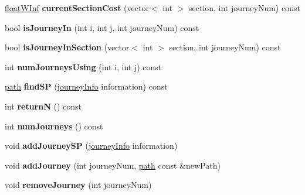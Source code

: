 \begin{DoxyCompactItemize}
\item 
\hypertarget{classedgeGroup_a2d23d9fec1e14e5e9d25389ac8576bb9}{
\hyperlink{classfloatWInf}{floatWInf} {\bfseries currentSectionCost} (vector$<$ int $>$ section, int journeyNum) const }
\label{classedgeGroup_a2d23d9fec1e14e5e9d25389ac8576bb9}

\item 
\hypertarget{classedgeGroup_a6c54fac4ebe0274e0ac9c040b8f2c15e}{
bool {\bfseries isJourneyIn} (int i, int j, int journeyNum) const }
\label{classedgeGroup_a6c54fac4ebe0274e0ac9c040b8f2c15e}

\item 
\hypertarget{classedgeGroup_aa1bbf4270ad97c1582011ea939460d09}{
bool {\bfseries isJourneyInSection} (vector$<$ int $>$ section, int journeyNum) const }
\label{classedgeGroup_aa1bbf4270ad97c1582011ea939460d09}

\item 
\hypertarget{classedgeGroup_a682cf284e27ec5ecc11904edc05feb71}{
int {\bfseries numJourneysUsing} (int i, int j) const }
\label{classedgeGroup_a682cf284e27ec5ecc11904edc05feb71}

\item 
\hypertarget{classedgeGroup_a9107f5c75bb210963582c0df769e9a34}{
\hyperlink{classpath}{path} {\bfseries findSP} (\hyperlink{classjourneyInfo}{journeyInfo} information) const }
\label{classedgeGroup_a9107f5c75bb210963582c0df769e9a34}

\item 
\hypertarget{classedgeGroup_a27d11c4fd553c080144a5a784e6cc079}{
int {\bfseries returnN} () const }
\label{classedgeGroup_a27d11c4fd553c080144a5a784e6cc079}

\item 
\hypertarget{classedgeGroup_acdc8a7aed73a269792cc53e3b545eff6}{
int {\bfseries numJourneys} () const }
\label{classedgeGroup_acdc8a7aed73a269792cc53e3b545eff6}

\item 
\hypertarget{classedgeGroup_a5cb73542a9315abd2b7dfb59b86dc532}{
void {\bfseries addJourneySP} (\hyperlink{classjourneyInfo}{journeyInfo} information)}
\label{classedgeGroup_a5cb73542a9315abd2b7dfb59b86dc532}

\item 
\hypertarget{classedgeGroup_afddd229a5c7c4a13015e9dcccbbe88d4}{
void {\bfseries addJourney} (int journeyNum, \hyperlink{classpath}{path} const \&newPath)}
\label{classedgeGroup_afddd229a5c7c4a13015e9dcccbbe88d4}

\item 
\hypertarget{classedgeGroup_aa3f1fac36a95030fcc5b605edfda5030}{
void {\bfseries removeJourney} (int journeyNum)}
\label{classedgeGroup_aa3f1fac36a95030fcc5b605edfda5030}


\end{DoxyCompactItemize}
